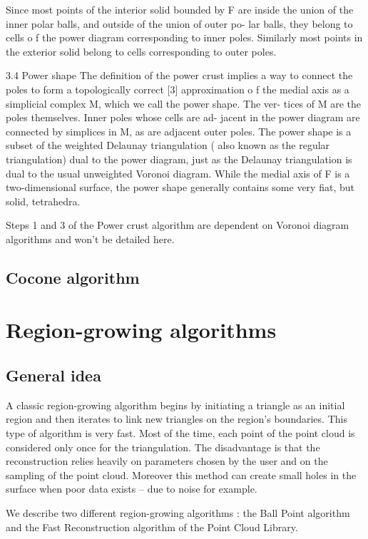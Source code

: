 \documentclass[a4paper]{article}
\begin{document}
Since most points of the interior solid bounded by F are inside the
union of the inner polar balls, and outside of the union of outer po-
lar balls, they belong to cells o f the power diagram corresponding
to inner poles. Similarly most points in the exterior solid belong to
cells corresponding to outer poles.

3.4    Power shape
The definition of the power crust implies a way to connect the poles
to form a topologically correct [3] approximation o f the medial axis
as a simplicial complex M, which we call the power shape. The ver-
tices of M are the poles themselves. Inner poles whose cells are ad-
jacent in the power diagram are connected by simplices in M, as are
adjacent outer poles. The power shape is a subset of the weighted
Delaunay triangulation ( also known as the regular triangulation)
dual to the power diagram, just as the Delaunay triangulation is dual
to the usual unweighted Voronoi diagram. While the medial axis of
F is a two-dimensional surface, the power shape generally contains
 some very fiat, but solid, tetrahedra.

Steps 1 and 3 of the Power crust algorithm are dependent on Voronoi diagram algorithms and won't be detailed here.


\subsection{Cocone algorithm}

\newpage

\section{Region-growing algorithms}
\subsection{General idea}
A classic region-growing algorithm begins by initiating a triangle as an initial region and then iterates to link new triangles on the region's boundaries. This type of algorithm is very fast. Most of the time, each point of the point cloud is considered only once for the triangulation. The disadvantage is that the reconstruction relies heavily on parameters chosen by the user and on the sampling of the point cloud. Moreover this method can create small holes in the surface when poor data  exists -- due to noise for example. 

We describe two different region-growing algorithms : the Ball Point algorithm and the Fast Reconstruction algorithm of the Point Cloud Library.
\end{document}
